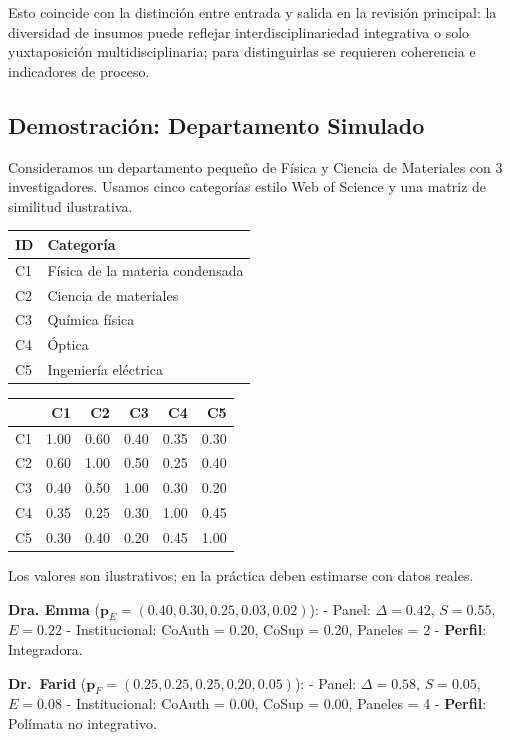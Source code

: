 \documentclass[
]{article}
\begin{document}
Esto coincide con la distinción entre entrada y salida en la revisión
principal: la diversidad de insumos puede reflejar interdisciplinariedad
integrativa o solo yuxtaposición multidisciplinaria; para distinguirlas
se requieren coherencia e indicadores de proceso.

\hypertarget{demostraciuxf3n-departamento-simulado}{%
\subsection{Demostración: Departamento
Simulado}\label{demostraciuxf3n-departamento-simulado}}

Consideramos un departamento pequeño de Física y Ciencia de Materiales
con 3 investigadores. Usamos cinco categorías estilo Web of Science y
una matriz de similitud ilustrativa.

\begin{longtable}[]{@{}ll@{}}
\toprule
ID & Categoría \\
\midrule
\endhead
C1 & Física de la materia condensada \\
C2 & Ciencia de materiales \\
C3 & Química física \\
C4 & Óptica \\
C5 & Ingeniería eléctrica \\
\bottomrule
\end{longtable}

\begin{longtable}[]{@{}lrrrrr@{}}
\toprule
& C1 & C2 & C3 & C4 & C5 \\
\midrule
\endhead
C1 & 1.00 & 0.60 & 0.40 & 0.35 & 0.30 \\
C2 & 0.60 & 1.00 & 0.50 & 0.25 & 0.40 \\
C3 & 0.40 & 0.50 & 1.00 & 0.30 & 0.20 \\
C4 & 0.35 & 0.25 & 0.30 & 1.00 & 0.45 \\
C5 & 0.30 & 0.40 & 0.20 & 0.45 & 1.00 \\
\bottomrule
\end{longtable}

Los valores son ilustrativos; en la práctica deben estimarse con datos
reales.

\textbf{Dra. Emma} (\(\mathbf{p}_E = (0.40, 0.30, 0.25, 0.03, 0.02)\)):
- Panel: \(\Delta = 0.42\), \(S = 0.55\), \(E = 0.22\) - Institucional:
CoAuth = 0.20, CoSup = 0.20, Paneles = 2 - \textbf{Perfil}: Integradora.

\textbf{Dr.~Farid} (\(\mathbf{p}_F = (0.25, 0.25, 0.25, 0.20, 0.05)\)):
- Panel: \(\Delta = 0.58\), \(S = 0.05\), \(E = 0.08\) - Institucional:
CoAuth = 0.00, CoSup = 0.00, Paneles = 4 - \textbf{Perfil}: Polímata no
integrativo.
\end{document}
